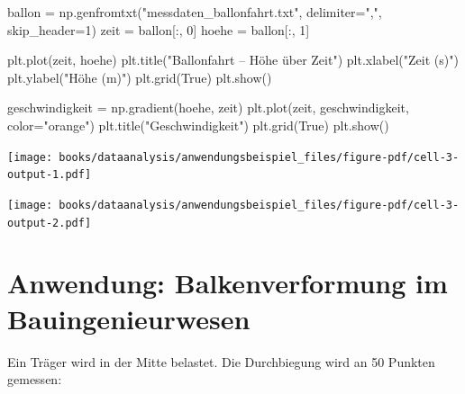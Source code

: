 \documentclass[
  letterpaper,
  DIV=11,
  numbers=noendperiod]{scrreprt}
\newenvironment{Shaded}{\begin{snugshade}}{\end{snugshade}}
\newcommand{\DecValTok}[1]{\textcolor[rgb]{0.68,0.00,0.00}{#1}}
\newcommand{\NormalTok}[1]{\textcolor[rgb]{0.00,0.23,0.31}{#1}}
\newcommand{\OperatorTok}[1]{\textcolor[rgb]{0.37,0.37,0.37}{#1}}
\newcommand{\StringTok}[1]{\textcolor[rgb]{0.13,0.47,0.30}{#1}}
\newcommand{\VariableTok}[1]{\textcolor[rgb]{0.07,0.07,0.07}{#1}}
\begin{document}
\begin{Shaded}
\begin{Highlighting}[]
\NormalTok{ballon }\OperatorTok{=}\NormalTok{ np.genfromtxt(}\StringTok{"messdaten\_ballonfahrt.txt"}\NormalTok{, delimiter}\OperatorTok{=}\StringTok{","}\NormalTok{, skip\_header}\OperatorTok{=}\DecValTok{1}\NormalTok{)}
\NormalTok{zeit }\OperatorTok{=}\NormalTok{ ballon[:, }\DecValTok{0}\NormalTok{]}
\NormalTok{hoehe }\OperatorTok{=}\NormalTok{ ballon[:, }\DecValTok{1}\NormalTok{]}

\NormalTok{plt.plot(zeit, hoehe)}
\NormalTok{plt.title(}\StringTok{"Ballonfahrt – Höhe über Zeit"}\NormalTok{)}
\NormalTok{plt.xlabel(}\StringTok{"Zeit (s)"}\NormalTok{)}
\NormalTok{plt.ylabel(}\StringTok{"Höhe (m)"}\NormalTok{)}
\NormalTok{plt.grid(}\VariableTok{True}\NormalTok{)}
\NormalTok{plt.show()}

\NormalTok{geschwindigkeit }\OperatorTok{=}\NormalTok{ np.gradient(hoehe, zeit)}
\NormalTok{plt.plot(zeit, geschwindigkeit, color}\OperatorTok{=}\StringTok{"orange"}\NormalTok{)}
\NormalTok{plt.title(}\StringTok{"Geschwindigkeit"}\NormalTok{)}
\NormalTok{plt.grid(}\VariableTok{True}\NormalTok{)}
\NormalTok{plt.show()}
\end{Highlighting}
\end{Shaded}

\texttt{[image: books/dataanalysis/anwendungsbeispiel\_files/figure-pdf/cell-3-output-1.pdf]}

\texttt{[image: books/dataanalysis/anwendungsbeispiel\_files/figure-pdf/cell-3-output-2.pdf]}

\section{Anwendung: Balkenverformung im
Bauingenieurwesen}\label{anwendung-balkenverformung-im-bauingenieurwesen}

Ein Träger wird in der Mitte belastet. Die Durchbiegung wird an 50
Punkten gemessen:
\end{document}
